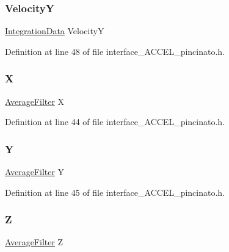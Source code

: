 \subsubsection{\texorpdfstring{VelocityY}{VelocityY}}
{\footnotesize\ttfamily \mbox{\hyperlink{filter__math__pincinato_8h_a614628710e855bdeb4949c83265e87e6}{Integration\+Data}} VelocityY}



Definition at line 48 of file interface\+\_\+\+A\+C\+C\+E\+L\+\_\+pincinato.\+h.

\mbox{\label{struct_process_data___a1dddeebb5e500ffea1704c56bad3e5de}} 
\subsubsection{\texorpdfstring{X}{X}}
{\footnotesize\ttfamily \mbox{\hyperlink{filter__math__pincinato_8h_a05751bcbb0782121ff05ae3b7fc37dac}{Average\+Filter}} X}



Definition at line 44 of file interface\+\_\+\+A\+C\+C\+E\+L\+\_\+pincinato.\+h.

\mbox{\label{struct_process_data___a999e007debe5468384855f5109e979c8}} 
\subsubsection{\texorpdfstring{Y}{Y}}
{\footnotesize\ttfamily \mbox{\hyperlink{filter__math__pincinato_8h_a05751bcbb0782121ff05ae3b7fc37dac}{Average\+Filter}} Y}



Definition at line 45 of file interface\+\_\+\+A\+C\+C\+E\+L\+\_\+pincinato.\+h.

\mbox{\label{struct_process_data___adcecb30f0d09efbdf979b7162fd73a59}} 
\subsubsection{\texorpdfstring{Z}{Z}}
{\footnotesize\ttfamily \mbox{\hyperlink{filter__math__pincinato_8h_a05751bcbb0782121ff05ae3b7fc37dac}{Average\+Filter}} Z}




